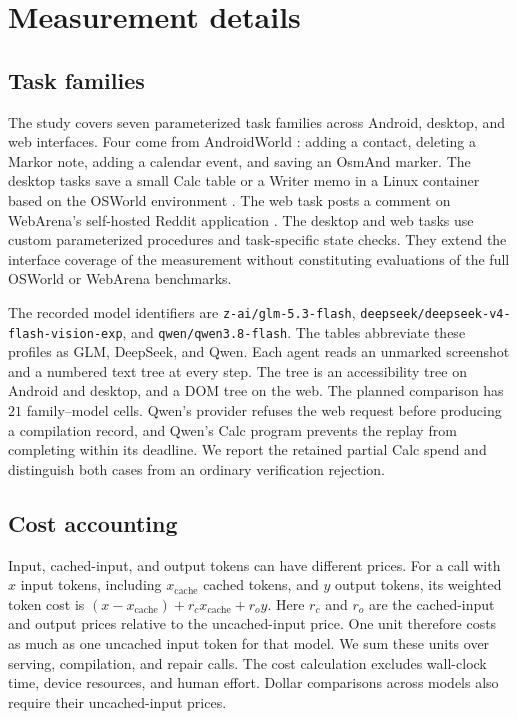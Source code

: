 \section{Measurement details}\label{app:measurement-details}

\subsection{Task families}
\label{sec:families}

The study covers seven parameterized task families across Android, desktop, and web interfaces.
Four come from AndroidWorld \citep{rawles2025androidworld}: adding a contact, deleting a Markor note, adding a calendar event, and saving an OsmAnd marker.
The desktop tasks save a small Calc table or a Writer memo in a Linux container based on the OSWorld environment \citep{xie2024osworld}.
The web task posts a comment on WebArena's self-hosted Reddit application \citep{zhou2024webarena}.
The desktop and web tasks use custom parameterized procedures and task-specific state checks.
They extend the interface coverage of the measurement without constituting evaluations of the full OSWorld or WebArena benchmarks.

The recorded model identifiers are \texttt{z-ai/glm-5.3-flash}, \texttt{deepseek/deepseek-v4-flash-vision-exp}, and \texttt{qwen/qwen3.8-flash}.
The tables abbreviate these profiles as GLM, DeepSeek, and Qwen.
Each agent reads an unmarked screenshot and a numbered text tree at every step.
The tree is an accessibility tree on Android and desktop, and a DOM tree on the web.
The planned comparison has $21$ family--model cells.
Qwen's provider refuses the web request before producing a compilation record, and Qwen's Calc program prevents the replay from completing within its deadline.
We report the retained partial Calc spend and distinguish both cases from an ordinary verification rejection.

\subsection{Cost accounting}\label{app:accounting}
\label{sec:unit}
Input, cached-input, and output tokens can have different prices.
For a call with $x$ input tokens, including $x_{\mathrm{cache}}$ cached tokens, and $y$ output tokens, its weighted token cost is $(x-x_{\mathrm{cache}})+r_c x_{\mathrm{cache}}+r_o y$.
Here $r_c$ and $r_o$ are the cached-input and output prices relative to the uncached-input price.
One unit therefore costs as much as one uncached input token for that model.
We sum these units over serving, compilation, and repair calls.
The cost calculation excludes wall-clock time, device resources, and human effort.
Dollar comparisons across models also require their uncached-input prices.

